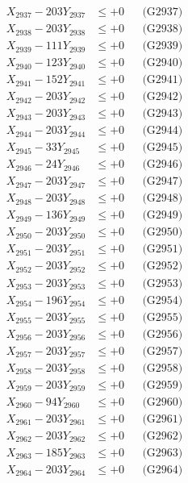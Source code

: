 \documentclass[a4paper,10pt]{article}
\begin{document}
{\begin{align}
X_{2937} - 203Y_{2937} &\leq +0 && \text{(G2937)} \\
X_{2938} - 203Y_{2938} &\leq +0 && \text{(G2938)} \\
X_{2939} - 111Y_{2939} &\leq +0 && \text{(G2939)} \\
X_{2940} - 123Y_{2940} &\leq +0 && \text{(G2940)} \\
\allowbreak
X_{2941} - 152Y_{2941} &\leq +0 && \text{(G2941)} \\
X_{2942} - 203Y_{2942} &\leq +0 && \text{(G2942)} \\
X_{2943} - 203Y_{2943} &\leq +0 && \text{(G2943)} \\
X_{2944} - 203Y_{2944} &\leq +0 && \text{(G2944)} \\
X_{2945} - 33Y_{2945} &\leq +0 && \text{(G2945)} \\
X_{2946} - 24Y_{2946} &\leq +0 && \text{(G2946)} \\
X_{2947} - 203Y_{2947} &\leq +0 && \text{(G2947)} \\
X_{2948} - 203Y_{2948} &\leq +0 && \text{(G2948)} \\
X_{2949} - 136Y_{2949} &\leq +0 && \text{(G2949)} \\
X_{2950} - 203Y_{2950} &\leq +0 && \text{(G2950)} \\
\allowbreak
X_{2951} - 203Y_{2951} &\leq +0 && \text{(G2951)} \\
X_{2952} - 203Y_{2952} &\leq +0 && \text{(G2952)} \\
X_{2953} - 203Y_{2953} &\leq +0 && \text{(G2953)} \\
X_{2954} - 196Y_{2954} &\leq +0 && \text{(G2954)} \\
X_{2955} - 203Y_{2955} &\leq +0 && \text{(G2955)} \\
X_{2956} - 203Y_{2956} &\leq +0 && \text{(G2956)} \\
X_{2957} - 203Y_{2957} &\leq +0 && \text{(G2957)} \\
X_{2958} - 203Y_{2958} &\leq +0 && \text{(G2958)} \\
X_{2959} - 203Y_{2959} &\leq +0 && \text{(G2959)} \\
X_{2960} - 94Y_{2960} &\leq +0 && \text{(G2960)} \\
\allowbreak
X_{2961} - 203Y_{2961} &\leq +0 && \text{(G2961)} \\
X_{2962} - 203Y_{2962} &\leq +0 && \text{(G2962)} \\
X_{2963} - 185Y_{2963} &\leq +0 && \text{(G2963)} \\
X_{2964} - 203Y_{2964} &\leq +0 && \text{(G2964)} \\

\end{align}}
\end{document}

